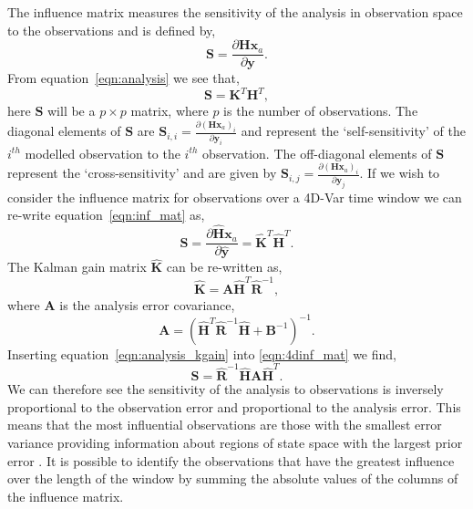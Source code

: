 \documentclass[11pt]{article}
\begin{document}
The influence matrix measures the sensitivity of the analysis in observation space to the observations \citep{Cardinali2004} and is defined by,
\begin{equation}
\textbf{S} = \frac{\partial \textbf{H}\textbf{x}_{a}}{\partial \textbf{y}}. \label{eqn:inf_mat}
\end{equation}
From equation~\eqref{eqn:analysis} we see that,
\begin{equation}
\textbf{S} = \textbf{K}^{T}\textbf{H}^{T},
\end{equation}
here $\textbf{S}$ will be a $p \times p$ matrix, where $p$ is the number of observations. The diagonal elements of $\textbf{S}$ are $\textbf{S}_{i,i} = \frac{\partial (\textbf{H}\textbf{x}_{a})_{i}}{\partial \textbf{y}_{i}}$ and represent the `self-sensitivity' of the $i^{th}$ modelled observation to the $i^{th}$ observation. The off-diagonal elements of $\textbf{S}$ represent the `cross-sensitivity' and are given by $\textbf{S}_{i,j} = \frac{\partial (\textbf{H}\textbf{x}_{a})_{i}}{\partial \textbf{y}_{j}}$. If we wish to consider the influence matrix for observations over a 4D-Var time window we can re-write equation~\eqref{eqn:inf_mat} as,
\begin{equation}
\textbf{S} = \frac{\partial \hat{\textbf{H}}\textbf{x}_{a}}{\partial \hat{\textbf{y}}} = \hat{\textbf{K}}^{T}\hat{\textbf{H}}^{T}. \label{eqn:4dinf_mat}
\end{equation}
The Kalman gain matrix $\hat{\textbf{K}}$ can be re-written as,
\begin{equation}
\hat{\textbf{K}} = \textbf{A}\hat{\textbf{H}}^{T}\hat{\textbf{R}}^{-1}, \label{eqn:analysis_kgain}
\end{equation}
where $\textbf{A}$ is the analysis error covariance,
\begin{equation}
\textbf{A} = (\hat{\textbf{H}}^{T}\hat{\textbf{R}}^{-1}\hat{\textbf{H}} + \textbf{B}^{-1})^{-1}.
\end{equation}
Inserting equation~\eqref{eqn:analysis_kgain} into \eqref{eqn:4dinf_mat} we find,
 \begin{equation}
 \textbf{S} = \hat{\textbf{R}}^{-1}\hat{\textbf{H}}\textbf{A}\hat{\textbf{H}}^{T}.
 \end{equation}
We can therefore see the sensitivity of the analysis to observations is inversely proportional to the observation error and proportional to the analysis error. This means that the most influential observations are those with the smallest error variance providing information about regions of state space with the largest prior error \citep{Cardinali2004}. It is possible to identify the observations that have the greatest influence over the length of the window by summing the absolute values of the columns of the influence matrix.
\end{document}
